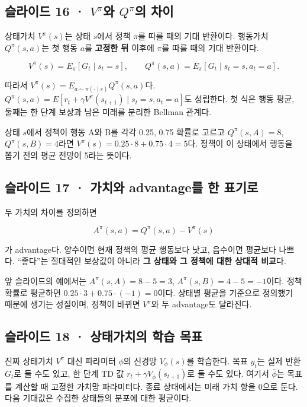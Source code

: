 \documentclass[11pt,a4paper]{article}
\begin{document}
\subsection{슬라이드 16 · $V^\pi$와 $Q^\pi$의 차이}

상태가치 $V^\pi(s)$는 상태 $s$에서 정책 $\pi$를 따를 때의 기대 반환이다. 행동가치 $Q^\pi(s,a)$는 첫 행동 $a$를 \textbf{고정한 뒤} 이후에 $\pi$를 따를 때의 기대 반환이다.\par

\[
V^\pi(s)=E_\pi[G_t\mid s_t=s],
\qquad
Q^\pi(s,a)=E_\pi[G_t\mid s_t=s,a_t=a].
\]

따라서 $V^\pi(s)=E_{a\sim\pi(\cdot\mid s)}Q^\pi(s,a)$다. $Q^\pi(s,a)=E[r_t+\gamma V^\pi(s_{t+1})\mid s_t=s,a_t=a]$도 성립한다. 첫 식은 행동 평균, 둘째는 한 단계 보상과 남은 미래를 분리한 Bellman 관계다.\par

상태 $s$에서 정책이 행동 A와 B를 각각 0.25, 0.75 확률로 고르고 $Q^\pi(s,A)=8$, $Q^\pi(s,B)=4$라면 $V^\pi(s)=0.25\cdot8+0.75\cdot4=5$다. 정책이 이 상태에서 행동을 뽑기 전의 평균 전망이 5라는 뜻이다.\par

\subsection{슬라이드 17 · 가치와 advantage를 한 표기로}

두 가치의 차이를 정의하면\par

\[
A^\pi(s,a)=Q^\pi(s,a)-V^\pi(s)
\]

가 advantage다. 양수이면 현재 정책의 평균 행동보다 낫고, 음수이면 평균보다 나쁘다. “좋다”는 절대적인 보상값이 아니라 \textbf{그 상태와 그 정책에 대한 상대적 비교}다.\par

앞 슬라이드의 예에서는 $A^\pi(s,A)=8-5=3$, $A^\pi(s,B)=4-5=-1$이다. 정책 확률로 평균하면 $0.25\cdot3+0.75\cdot(-1)=0$이다. 상태별 평균을 기준으로 정의했기 때문에 생기는 성질이며, 정책이 바뀌면 $V^\pi$와 두 advantage도 달라진다.\par

\subsection{슬라이드 18 · 상태가치의 학습 목표}

진짜 상태가치 $V^\pi$ 대신 파라미터 $\phi$의 신경망 $V_\phi(s)$를 학습한다. 목표 $y_t$는 실제 반환 $G_t$로 둘 수도 있고, 한 단계 TD 값 $r_t+\gamma V_{\bar\phi}(s_{t+1})$로 둘 수도 있다. 여기서 $\bar\phi$는 목표를 계산할 때 고정한 가치망 파라미터다. 종료 상태에서는 미래 가치 항을 0으로 둔다. 다음 기대값은 수집한 상태들의 분포에 대한 평균이다.\par
\end{document}

